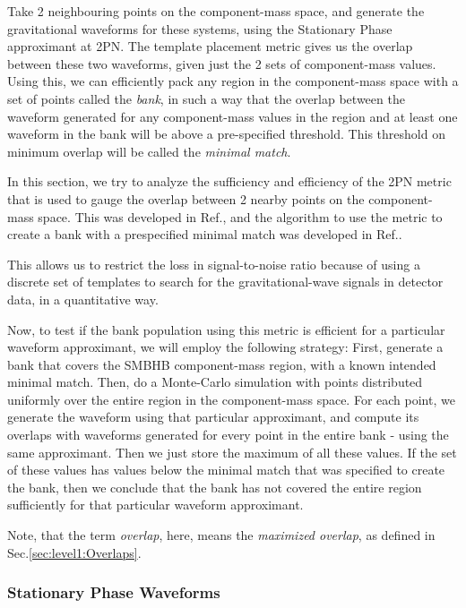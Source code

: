 \documentclass[aps,
prd,
amsmath,
amssymb,
twocolumn,
floatfix,
groupedaddress]{revtex4-1}
\begin{document}
Take 2 neighbouring points on the component-mass space, and generate the gravitational waveforms for these systems, using the Stationary Phase approximant at 2PN. The template placement metric gives us the overlap between these two waveforms, given just the 2 sets of component-mass values. Using this, we can efficiently pack any region in the component-mass space with a set of points called the \textit{bank}, in such a way that the overlap between the waveform generated for any component-mass values in the region and at least one waveform in the bank will be above a pre-specified threshold. This threshold on minimum overlap will be called the \textit{minimal match}.

In this section, we try to analyze the sufficiency and efficiency of the 2PN metric that is used to gauge the overlap between 2 nearby points on the component-mass space. This was developed in Ref.\citep{SathyaMetric2PN,OwenTemplateSpacing,SathyaBankPlacementTauN}, and the algorithm to use the metric to create a bank with a prespecified minimal match was developed in Ref.\citep{BabaketalBankPlacement}. 

This allows us to restrict the loss in signal-to-noise ratio because of using a discrete set of templates to search for the gravitational-wave signals in detector data, in a quantitative way.

Now, to test if the bank population using this metric is efficient for a particular waveform approximant, we will employ the following strategy: First, generate a bank that covers the SMBHB component-mass region, with a known intended minimal match. Then, do a Monte-Carlo simulation with points distributed uniformly over the entire region in the component-mass space. For each point, we generate the waveform  using that particular approximant, and compute its overlaps with waveforms generated for every point in the entire bank - using the same approximant. Then we just store the maximum of all these values. If the set of these values has values below the minimal match that was specified to create the bank, then we conclude that the bank has not covered the entire region sufficiently for that particular waveform approximant.

Note, that the term \textit{overlap}, here, means the \textit{maximized overlap}, as defined in Sec.\ref{sec:level1:Overlaps}.

\subsubsection{Stationary Phase Waveforms}
\end{document}
